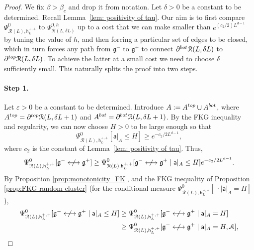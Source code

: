 \documentclass[11pt,a4paper]{article}
\theoremstyle{definition}
\numberwithin{equation}{section}
\newcommand\fg{\mathfrak{g}}
\begin{document}
\begin{proof}
We fix $\beta>\beta_c$ and drop it from notation. Let $\delta>0$ be a constant to be determined. Recall Lemma~\ref{lem: positivity of tau}. Our aim is to first compare $\Psi^{0}_{\mathcal R(L),\mathsf{h}^{+,+}_{L}}$ to $\Psi^{0,h}_{\mathcal{R}(L,\delta L)}$ up to a cost that we can make smaller than $e^{(c_2/2) L^{d-1}}$ by tuning the value of $h$, and then forcing a particular set of edges to be closed, which in turn forces any path from $\fg^{-}$ to $\fg^{+}$ to connect $\partial^{\rm bot} \mathcal R(L, \delta L) $ to $ \partial^{\rm top} \mathcal R(L, \delta L)$. To achieve the latter at a small cost we need to choose $\delta$ sufficiently small. This naturally splits the proof into two steps.

\paragraph{Step 1.}
Let $\varepsilon>0$ be a constant to be determined. Introduce  $A:= A^{\rm top}\cup A^{\rm bot}$, where $A^{\rm top}=\partial^{\rm top}\mathcal{R}(L,\delta L+1)$ and $A^{\rm bot}=\partial^{\rm bot}\mathcal{R}(L,\delta L+1)$. By the FKG inequality and regularity, we can now choose $H>0$ to be large enough so that 
\begin{equation}
\Psi^0_{\mathcal{R}(L),\mathsf{h}^{+,+}_L} [\mathsf{a}|_A\leq H ]\geq e^{-c_2/2 L^{d-1}}, 
\end{equation}
where $c_2$ is the constant of Lemma~\ref{lem: positivity of tau}. Thus,
\begin{equation}\label{eq: proof lemma T1}
\Psi^0_{\mathcal{R}(L),\mathsf{h}^{+,+}_L} [\fg^{-}\centernot \longleftrightarrow \fg^{+}]\geq \Psi^0_{\mathcal{R}(L),\mathsf{h}^{+,+}_L} [\fg^{-}\centernot \longleftrightarrow \fg^{+} \mid \mathsf{a}|_A\leq H ] e^{-c_2/2 L^{d-1}}.
\end{equation}
By Proposition \ref{prop:monotonicity_FK}, and the FKG inequality of Proposition \ref{prop:FKG random cluster} (for the conditional measure $\Psi^0_{\mathcal R(L), \mathsf h^{+,+}_L}[\: \cdot \mid \mathsf a|_A = H]$),
\begin{equation}
\begin{aligned}
\Psi^0_{\mathcal{R}(L),\mathsf{h}^{+,+}_L} [\fg^{-}\centernot \longleftrightarrow \fg^{+} \mid \mathsf{a}|_A\leq H ]& \geq \Psi^0_{\mathcal{R}(L),\mathsf{h}^{+,+}_L} [\fg^{-}\centernot \longleftrightarrow \fg^{+} \mid \mathsf{a}|_{A}=H] \\ &\geq \Psi^0_{\mathcal{R}(L),\mathsf{h}^{+,+}_L} [\fg^{-}\centernot \longleftrightarrow \fg^{+} \mid \mathsf a|_A=H,  \mathcal{A}],

\end{aligned}
\end{equation}
\end{proof}
\end{document}

